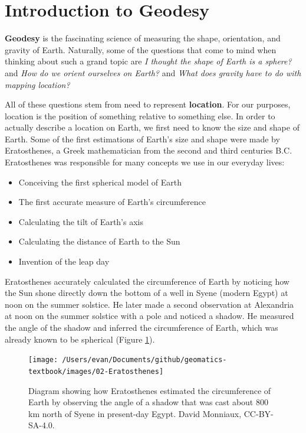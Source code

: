 \documentclass[
]{book}
\providecommand{\tightlist}{%
  \setlength{\itemsep}{0pt}\setlength{\parskip}{0pt}}
\begin{document}
\hypertarget{introduction-to-geodesy}{%
\section{Introduction to Geodesy}\label{introduction-to-geodesy}}

\textbf{Geodesy} is the fascinating science of measuring the shape, orientation, and gravity of Earth. Naturally, some of the questions that come to mind when thinking about such a grand topic are \emph{I thought the shape of Earth is a sphere?} and \emph{How do we orient ourselves on Earth?} and \emph{What does gravity have to do with mapping location?}

All of these questions stem from need to represent \textbf{location}. For our purposes, location is the position of something relative to something else. In order to actually describe a location on Earth, we first need to know the size and shape of Earth. Some of the first estimations of Earth's size and shape were made by Eratosthenes, a Greek mathematician from the second and third centuries B.C. Eratosthenes was responsible for many concepts we use in our everyday lives:

\begin{itemize}
\tightlist
\item
  Conceiving the first spherical model of Earth
\item
  The first accurate measure of Earth's circumference
\item
  Calculating the tilt of Earth's axis
\item
  Calculating the distance of Earth to the Sun
\item
  Invention of the leap day
\end{itemize}

Eratosthenes accurately calculated the circumference of Earth by noticing how the Sun shone directly down the bottom of a well in Syene (modern Egypt) at noon on the summer solstice. He later made a second observation at Alexandria at noon on the summer solstice with a pole and noticed a shadow. He measured the angle of the shadow and inferred the circumference of Earth, which was already known to be spherical (Figure \ref{fig:2-Eratosthenes}).

\begin{figure}
\texttt{[image: /Users/evan/Documents/github/geomatics-textbook/images/02-Eratosthenes]} \caption{Diagram showing how Eratosthenes estimated the circumference of Earth by observing the angle of a shadow that was cast about 800 km north of Syene in present-day Egypt. David Monniaux, CC-BY-SA-4.0.}\label{fig:2-Eratosthenes}
\end{figure}
\end{document}
